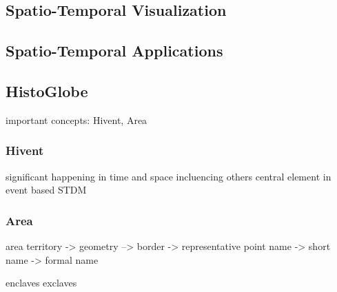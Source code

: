 \subsection{Spatio-Temporal Visualization} %
\label{sub:spatio_temporal_visualization}




\subsection{Spatio-Temporal Applications} %
\label{sub:spatio_temporal_applications}




\subsection{HistoGlobe} %
\label{sub:histoglobe}



important concepts: Hivent, Area

\subsubsection{Hivent} %
\label{ssub:hivent}

significant happening in time and space
incluencing others
central element in event based STDM



\subsubsection{Area} %
\label{ssub:area}

area
territory
-> geometry
--> border
-> representative point
name
-> short name
-> formal name

enclaves
exclaves







